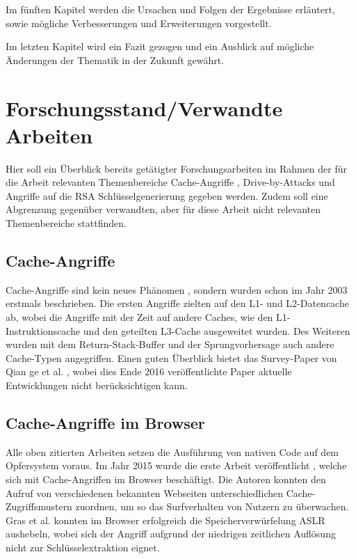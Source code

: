 Im fünften Kapitel werden die Ursachen und Folgen der Ergebnisse erläutert, sowie mögliche Verbesserungen und Erweiterungen vorgestellt.

Im letzten Kapitel wird ein Fazit gezogen und ein Ausblick auf mögliche Änderungen der Thematik in der Zukunft gewährt.

\section{Forschungsstand/Verwandte Arbeiten}

Hier soll ein Überblick bereits getätigter Forschungsarbeiten im Rahmen der für die Arbeit relevanten Themenbereiche Cache-Angriffe , Drive-by-Attacks und Angriffe auf die RSA Schlüsselgenerierung gegeben werden. Zudem soll eine Abgrenzung gegenüber verwandten, aber für diese Arbeit nicht relevanten Themenbereiche stattfinden.

\subsection{Cache-Angriffe}

Cache-Angriffe sind kein neues Phänomen \cite{BernsteinAES, CacheAttacksCountermeasuresAESShamir}, sondern wurden schon im Jahr 2003 \cite{DESCacheAttack2003} erstmals beschrieben.
Die ersten Angriffe zielten auf den L1- und L2-Datencache \cite{CacheAttacksCountermeasuresAESShamir} ab, wobei die Angriffe mit der Zeit auf andere Caches, wie den L1-Instruktionscache \cite{NewResultsInstructionCacheAttacks} und den geteilten L3-Cache \cite{CacheAttacksCloud, LiuPrimeAndProbe} ausgeweitet wurden.
Des Weiteren wurden mit dem Return-Stack-Buffer \cite{Maisuradze2018ret2specSE} und der Sprungvorhersage \cite{BranchPredictionVulnerabilitiesOpenSSL, PredictingSecretKeysViaBranchPrediction, CovertChannelsThroughBranchPredictors} auch andere Cache-Typen angegriffen.
Einen guten Überblick bietet das Survey-Paper von Qian ge et al. \cite{SurveyTimingAttacksCountermeasures}, wobei dies Ende 2016 veröffentlichte Paper aktuelle Entwicklungen nicht berücksichtigen kann.

\subsection{Cache-Angriffe im Browser}

Alle oben zitierten Arbeiten setzen die Ausführung von nativen Code auf dem Opfersystem voraus. Im Jahr 2015 wurde die erste Arbeit veröffentlicht \cite{TheSpyInTheSandbox}, welche sich mit Cache-Angriffen im Browser beschäftigt.
Die Autoren konnten den Aufruf von verschiedenen bekannten Webseiten unterschiedlichen Cache-Zugriffsmustern zuordnen, um so das Surfverhalten von Nutzern zu überwachen.
Gras et al. \cite{ASLROnTheLine} konnten im Browser erfolgreich die Speicherverwürfelung ASLR aushebeln, wobei sich der Angriff aufgrund der niedrigen zeitlichen Auflösung nicht zur Schlüsselextraktion eignet.

